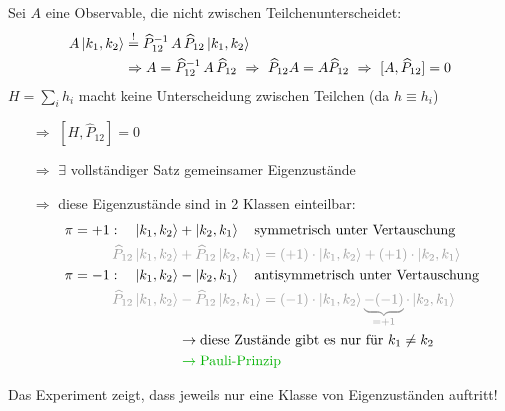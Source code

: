 Sei $A$ eine Observable, die nicht zwischen Teilchenunterscheidet:
\begin{align}
    A \ket{k_1,k_2} &\stackrel{!}{=} \widehat{P}_{12}^{-1} \, A \, \widehat{P}_{12} \ket{k_1,k_2} \\
    &\Rightarrow A = \widehat{P}_{12}^{-1} \, A \, \widehat{P}_{12} \ \Rightarrow \ \widehat{P}_{12} A = A \widehat{P}_{12} \ \Rightarrow \ [A,\widehat{P}_{12}]=0
\end{align}
$H=\sum_i h_i$ macht keine Unterscheidung zwischen Teilchen (da $h \equiv h_i$)
\begin{itemize}
    \item[$\Rightarrow$] $[H,\widehat{P}_{12}]=0$
    \item[$\Rightarrow$] $\exists$ vollständiger Satz gemeinsamer Eigenzustände 
    \item[$\Rightarrow$] diese Eigenzustände sind in 2 Klassen einteilbar:
    \begin{align}
        \pi = +1 : \quad \ket{k_1,k_2}&+\ket{k_2,k_1} \quad \text{symmetrisch unter Vertauschung}\\
        \color{black!40} \widehat{P}_{12}\ket{k_1,k_2}&\color{black!40}+\widehat{P}_{12}\ket{k_2,k_1} = (+1)\cdot\ket{k_1,k_2} + (+1) \cdot \ket{k_2,k_1}\\
        \pi = -1 : \quad \ket{k_1,k_2}&-\ket{k_2,k_1} \quad \text{antisymmetrisch unter Vertauschung}\\
        \color{black!40} \widehat{P}_{12}\ket{k_1,k_2}&\color{black!40}-\widehat{P}_{12}\ket{k_2,k_1} = (-1)\cdot\ket{k_1,k_2} \underbrace{- (-1)}_{=+1} \cdot \ket{k_2,k_1}\\
        &\rightarrow \text{diese Zustände gibt es nur für } k_1 \neq k_2\\
        &\color{green!70!black} \rightarrow \text{Pauli-Prinzip} \color{black}
    \end{align}
\end{itemize}
Das Experiment zeigt, dass jeweils nur eine Klasse von Eigenzuständen auftritt!

